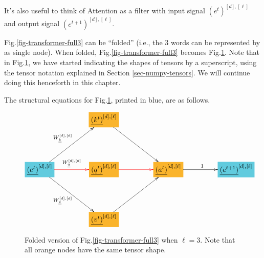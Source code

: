 It's also useful to think of Attention
as a filter with input signal $(e^t)^{[d], [\ell]}$ and output signal
$(e^{t+1})^{[d], [\ell]}$.

Fig.\ref{fig-transformer-full3} can
be \enquote{folded} (i.e., the 3 words can be
represented by as single node).
When folded, Fig.\ref{fig-transformer-full3}
becomes Fig.\ref{fig-transformer-recurrent-folded-1head}. Note that in Fig.\ref{fig-transformer-recurrent-folded-1head}, we have started indicating the
shapes of tensors by a superscript,
using the tensor notation
explained in Section \ref{sec-numpy-tensors}. We will continue doing this henceforth in this chapter.

The structural equations for
Fig.\ref{fig-transformer-recurrent-folded-1head}, printed in blue,
are as follows.




\begin{figure}[!h]\centering
$$\xymatrix@R=4pc@C=4pc{
&*+[F*:Dandelion]{\underline{(k^t)}^{[d],[\ell]}}\ar[dr]&&
\\
*+[F*:SkyBlue]{\underline{(e^t)}^{[d],[\ell]}}\ar[ur]^{W_\rvk^{[d], [d]}}\ar@[red][r]^{W_\rvq^{[d], [d]}}\ar[dr]_{W_\rvv^{[d], [d]}}&*+[F*:Dandelion]{\underline{(q^t)}^{[d],[\ell]}}\ar@[red][r]&*+[F*:Dandelion]{\underline{(a^t)}^{[d],[\ell]}}\ar[r]^{1}&*+[F*:SkyBlue]{\underline{(e^{t+1})}^{[d],[\ell]}}
\\
&*+[F*:Dandelion]{\underline{(v^t)}^{[d],[\ell]}}\ar[ur]&&
}$$
\caption{Folded version of
Fig.\ref{fig-transformer-full3} when $\ell=3$. Note that all orange nodes
have the same tensor shape.}
\label{fig-transformer-recurrent-folded-1head}
\end{figure}


